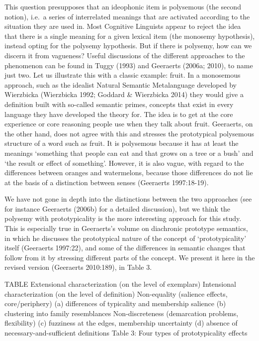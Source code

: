 This question presupposes that an ideophonic item is polysemous (the
second notion), i.e.~a series of interrelated meanings that are
activated according to the situation they are used in. Most Cognitive
Linguists appear to reject the idea that there is a single meaning for a
given lexical item (the monosemy hypothesis), instead opting for the
polysemy hypothesis. But if there is polysemy, how can we discern it
from vagueness? Useful discussions of the different approaches to the
phenomenon can be found in Tuggy (1993) and Geeraerts (2006a; 2010), to
name just two. Let us illustrate this with a classic example: fruit. In
a monosemous approach, such as the idealist Natural Semantic
Metalanguage developed by Wierzbicka (Wierzbicka 1992; Goddard \&
Wierzbicka 2014) they would give a definition built with so-called
semantic primes, concepts that exist in every language they have
developed the theory for. The idea is to get at the core experience or
core reasoning people use when they talk about fruit. Geeraerts, on the
other hand, does not agree with this and stresses the prototypical
polysemous structure of a word such as fruit. It is polysemous because
it has at least the meanings `something that people can eat and that
grows on a tree or a bush' and `the result or effect of something'.
However, it is also vague, with regard to the differences between
oranges and watermelons, because those differences do not lie at the
basis of a distinction between senses (Geeraerts 1997:18-19).

We have not gone in depth into the distinctions between the two
approaches (see for instance Geeraerts (2006b) for a detailed
discussion), but we think the polysemy with prototypicality is the more
interesting approach for this study. This is especially true in
Geeraerts's volume on diachronic prototype semantics, in which he
discusses the prototypical nature of the concept of `prototypicality'
itself (Geeraerts 1997:22), and some of the differences in semantic
changes that follow from it by stressing different parts of the concept.
We present it here in the revised version (Geeraerts 2010:189), in Table
3.

TABLE Extensional characterization (on the level of exemplars)
Intensional characterization (on the level of definition) Non-equality
(salience effects, core/periphery) (a) differences of typicality and
membership salience (b) clustering into family resemblances
Non-discreteness (demarcation problems, flexibility) (c) fuzziness at
the edges, membership uncertainty (d) absence of
necessary-and-sufficient definitions Table 3: Four types of
prototypicality effects

